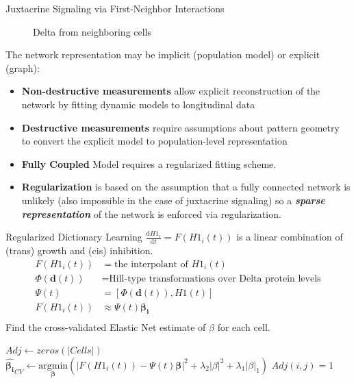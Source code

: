 \documentclass[xelatex]{beamer}
\newlength{\colwidth}
\begin{document}
\begin{frame}[t]
\begin{columns}[t]
\begin{column}{\colwidth}
\begin{block}{Juxtacrine Signaling via First-Neighbor Interactions}
\begin{figure}
\begin{minipage}{0.4\textwidth}
			\caption{Delta from neighboring cells}
			\label{fig:li_in}
		\end{minipage}
	\end{figure}

	The network representation may be implicit (population model) or explicit (graph):
	\begin{itemize}
		\item \textbf{Non-destructive measurements} allow explicit reconstruction of the network by fitting dynamic models to longitudinal data
		\item \textbf{Destructive measurements} require assumptions about pattern geometry to convert the explicit model to population-level representation
		\item \textbf{Fully Coupled} Model requires a regularized fitting scheme.
		\item \textbf{Regularization} is based on the assumption that a fully connected network is unlikely (also impossible in the case of juxtacrine signaling) so a \textit{\textbf{sparse representation}} of the network is enforced via regularization.
	\end{itemize}
  \end{block}

\begin{alertblock}{Regularized Dictionary Learning}
	$\frac{\mathrm d \textit{H1}_i}{\mathrm dt} = F(\textit{H1}_i(t))$ is a linear combination of (trans) growth and (cis) inhibition.
	\begin{equation}\label{eq:state}
	\begin{split}
	F(\textit{H1}_i(t)) &= \text{the interpolant of } \textit{H1}_i(t)\\
	\Phi(\bm{d}(t)) &= \text{Hill-type transformations over Delta protein levels} \\
	\Psi(t) &=  \left [\Phi(\bm{d}(t)), \textit{H1}(t) \right] \\
	F(\textit{H1}_i(t)) &\approx \Psi(t) \bm{\beta_i} \\[1em]
	\end{split}
	\end{equation}
	Find the cross-validated Elastic Net estimate \cite{zou_regularization_2005} of $\beta$ for each cell.\\[1em]	
	\centering
	\begin{minipage}{0.7\textwidth}
		\begin{algorithmic}
			\STATE $Adj\gets zeros(|Cells|)$
			\STATE $\bm{\hat{\beta_i}}_{CV} \gets \underset{\bm{\beta}}{\mathrm{argmin}} \left( \big|F(H1_i(t)) - \Psi(t)\bm{\beta} \big|^2 + \lambda_2 \big| \beta \big|^2 + \lambda_1 \big|\beta \big|_1  \right)$
			\STATE $Adj(i,j) = 1$
			\ENDIF
			\ENDFOR
			\ENDFOR 
		\end{algorithmic}
	\end{minipage}
	\normalsize
\end{alertblock}


\end{column}
\end{columns}
\end{frame}
\end{document}
